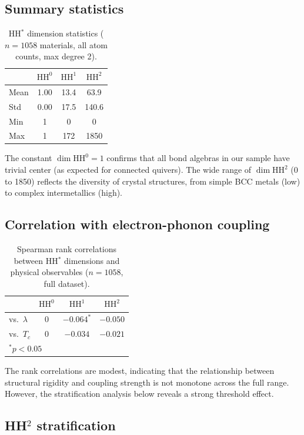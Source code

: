\documentclass[12pt,a4paper]{article}
\newcommand{\HH}{\mathrm{HH}}
\begin{document}
\subsection{Summary statistics}

\begin{table}[h]
\centering
\caption{HH$^*$ dimension statistics ($n = 1058$ materials,
all atom counts, max degree 2).}
\label{tab:hh-stats}
\begin{tabular}{lccc}
\toprule
& $\HH^0$ & $\HH^1$ & $\HH^2$ \\
\midrule
Mean & 1.00 & 13.4 & 63.9 \\
Std & 0.00 & 17.5 & 140.6 \\
Min & 1 & 0 & 0 \\
Max & 1 & 172 & 1850 \\
\bottomrule
\end{tabular}
\end{table}

The constant $\dim\HH^0 = 1$ confirms that all bond algebras in our
sample have trivial center (as expected for connected quivers).
The wide range of $\dim\HH^2$ (0 to 1850) reflects the diversity
of crystal structures, from simple BCC metals (low) to complex
intermetallics (high).

\subsection{Correlation with electron-phonon coupling}

\begin{table}[h]
\centering
\caption{Spearman rank correlations between HH$^*$ dimensions and
physical observables ($n = 1058$, full dataset).}
\label{tab:correlations}
\begin{tabular}{lccc}
\toprule
& $\HH^0$ & $\HH^1$ & $\HH^2$ \\
\midrule
vs.\ $\lambda$ & 0 & $-0.064^{*}$ & $-0.050$ \\
vs.\ $T_c$ & 0 & $-0.034$ & $-0.021$ \\
\bottomrule
\multicolumn{4}{l}{\footnotesize $^*p<0.05$}
\end{tabular}
\end{table}

The rank correlations are modest, indicating that the
relationship between structural rigidity and coupling strength
is not monotone across the full range. However, the
stratification analysis below reveals a strong threshold effect.

\subsection{HH$^2$ stratification}
\end{document}
